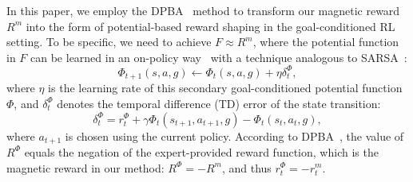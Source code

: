 \documentclass[journal]{IEEEtran}
\begin{document}
In this paper, we employ the DPBA~\citep{harutyunyan2015expressing} method to transform our magnetic reward $R^{m}$ into the form of potential-based reward shaping in the goal-conditioned RL setting.
To be specific, we need to achieve $F \approx R^{m}$,
where the potential function in $F$ can be learned in an on-policy way~\cite{suay2016learning} with a technique analogous to SARSA~\cite{rummery1994line}:
\begin{equation}
    \Phi_{t+1}(s,a,g) \leftarrow \Phi_{t}(s,a,g) + \eta\delta_t^{\Phi},
\label{phi-update}
\end{equation}
where $\eta$ is the learning rate of this secondary goal-conditioned potential function $\Phi$, and $\delta_t^{\Phi}$ denotes the temporal difference (TD) error of the state transition:
\begin{equation}
    \delta_t^{\Phi} = r_{t}^{\Phi} + \gamma\Phi_t(s_{t+1},a_{t+1},g) - \Phi_t(s_t,a_t,g),
\end{equation}
where $a_{t+1}$ is chosen using the current policy.
According to DPBA~\citep{harutyunyan2015expressing}, the value of $R^{\Phi}$ equals the negation of the expert-provided reward function, which is the magnetic reward in our method: $R^{\Phi} = -R^{m}$, and thus $r_{t}^{\Phi} = - r^{m}_{t}$.
\end{document}
